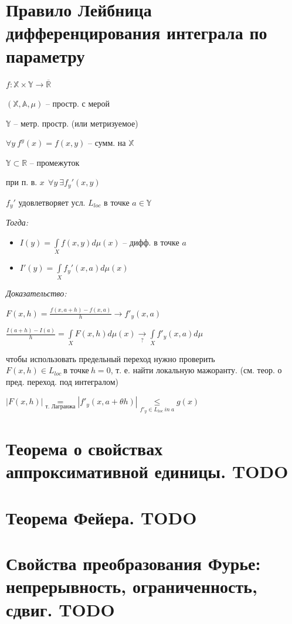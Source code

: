 \documentclass[paper=a4, fontsize=17pt]{article}
\begin{document}
\section{Правило Лейбница дифференцирования интеграла по параметру}

$ f : \mathbb{X} \times \mathbb{Y} \rightarrow \overline{\mathbb{R}}$

$ (\mathbb{X}, \mathbb{A}, \mu) $ -- простр. с мерой

$ \mathbb{Y} $ -- метр. простр. (или метризуемое)

$ \forall y ~ f^y(x) = f(x, y) $ -- сумм. на $ \mathbb{X} $

\bigskip

$ \mathbb{Y} \subset \mathbb{R} $ -- промежуток

при п. в. $ x ~~ \forall y ~ \exists f_y'(x, y)$

$ f_y' $ удовлетворяет усл. $ L_{loc} $ в точке $ a \in \mathbb{Y}$

\emph{Тогда:}
\begin{itemize}
	\item $ I(y) = \int\limits_{X} f(x, y) d\mu(x) $ -- дифф. в точке $ a $
	\item $ I'(y) = \int\limits_{X} f_y'(x, a) d\mu(x) $
\end{itemize}

\emph{Доказательство:}

	$ F(x, h) = \frac{f(x, a + h) - f(x, a)}{h} \rightarrow f'_y(x, a) $

	$ \frac{I(a + h) - I(a)}{h} = \int\limits_X F(x, h) d\mu(x)
	  \underset{?}{\rightarrow} \int\limits_X f'_y(x, a) d\mu$

	  чтобы использовать предельный переход нужно проверить
	  $ F(x, h) \in L_{loc} ~ \text{в точке} ~  h = 0 $, т. е. найти локальную мажоранту. (см. теор. о пред. переход. под интегралом)

	$ |F(x, h)| \underset{\text{т. Лагранжа}}{=}
	|f'_y(x, a + \theta h)| \underset{f'_y \in L_{loc} ~ in ~ a}{\leq} g(x) $

\section{Теорема о свойствах аппроксимативной единицы. TODO}
\section{Теорема Фейера. TODO} 
\section{Свойства преобразования Фурье: непрерывность, ограниченность, сдвиг. TODO}
\end{document}

